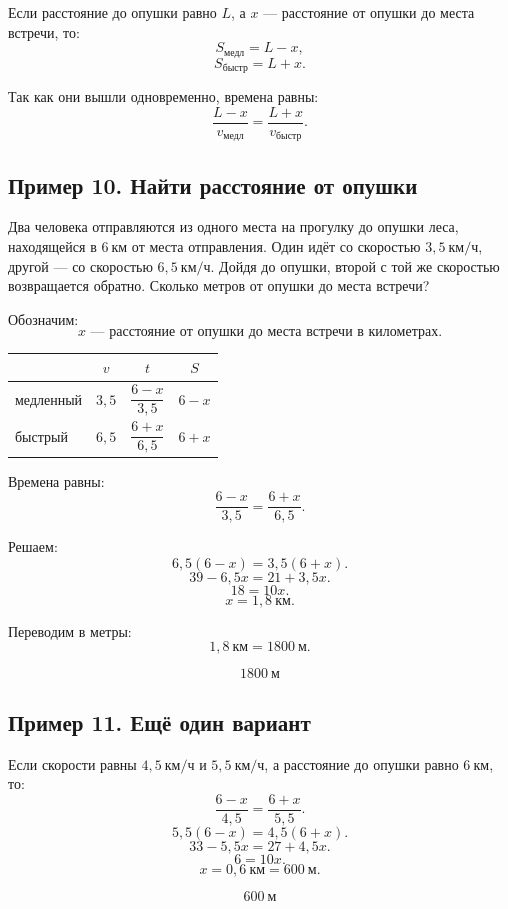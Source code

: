 \documentclass[a4paper,12pt]{article}
\newcommand{\kmh}{\text{км/ч}}
\newcommand{\km}{\text{км}}
\newcommand{\m}{\text{м}}
\begin{document}
Если расстояние до опушки равно $L$, а $x$ --- расстояние от опушки до места встречи, то:
\[
S_{\text{медл}}=L-x,
\]
\[
S_{\text{быстр}}=L+x.
\]

Так как они вышли одновременно, времена равны:
\[
\frac{L-x}{v_{\text{медл}}}=\frac{L+x}{v_{\text{быстр}}}.
\]

\subsection{Пример 10. Найти расстояние от опушки}

Два человека отправляются из одного места на прогулку до опушки леса, находящейся в $6\ \km$ от места отправления. Один идёт со скоростью $3{,}5\ \kmh$, другой --- со скоростью $6{,}5\ \kmh$. Дойдя до опушки, второй с той же скоростью возвращается обратно. Сколько метров от опушки до места встречи?

Обозначим:
\[
x \text{ --- расстояние от опушки до места встречи в километрах}.
\]

\begin{center}
\renewcommand{\arraystretch}{1.35}
\begin{tabularx}{0.82\linewidth}{X c c c}
\toprule
 & $v$ & $t$ & $S$ \\
\midrule
медленный & $3{,}5$ & $\dfrac{6-x}{3{,}5}$ & $6-x$ \\
быстрый & $6{,}5$ & $\dfrac{6+x}{6{,}5}$ & $6+x$ \\
\bottomrule
\end{tabularx}
\end{center}

Времена равны:
\[
\frac{6-x}{3{,}5}=\frac{6+x}{6{,}5}.
\]

Решаем:
\[
6{,}5(6-x)=3{,}5(6+x).
\]
\[
39-6{,}5x=21+3{,}5x.
\]
\[
18=10x.
\]
\[
x=1{,}8\ \km.
\]

Переводим в метры:
\[
1{,}8\ \km=1800\ \m.
\]

\[
\boxed{1800\ \m}
\]

\subsection{Пример 11. Ещё один вариант}

Если скорости равны $4{,}5\ \kmh$ и $5{,}5\ \kmh$, а расстояние до опушки равно $6\ \km$, то:
\[
\frac{6-x}{4{,}5}=\frac{6+x}{5{,}5}.
\]
\[
5{,}5(6-x)=4{,}5(6+x).
\]
\[
33-5{,}5x=27+4{,}5x.
\]
\[
6=10x.
\]
\[
x=0{,}6\ \km=600\ \m.
\]

\[
\boxed{600\ \m}
\]
\end{document}

